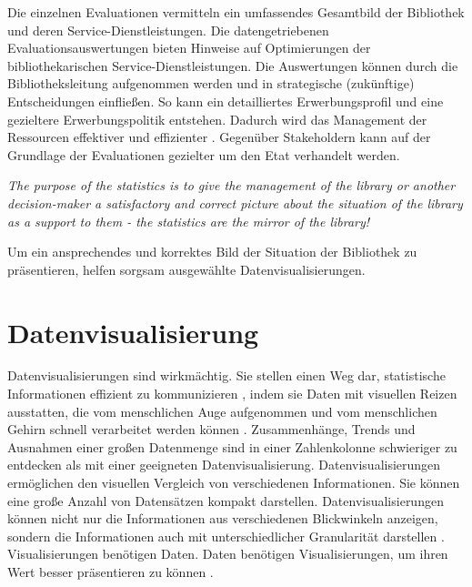 Die einzelnen Evaluationen vermitteln ein umfassendes Gesamtbild der Bibliothek und deren Service-Dienstleistungen. 
Die datengetriebenen Evaluationsauswertungen bieten Hinweise auf Optimierungen der bibliothekarischen Service-Dienstleistungen. 
Die Auswertungen können durch die Bibliotheksleitung aufgenommen werden und in strategische (zukünftige) Entscheidungen einfließen. 
So kann ein detailliertes Erwerbungsprofil und eine gezieltere Erwerbungspolitik entstehen. 
Dadurch wird das Management der Ressourcen effektiver und effizienter \cite[vgl.][297]{johnson_peggy_fundamentals_2014}.
Gegenüber Stakeholdern kann auf der Grundlage der Evaluationen gezielter um den Etat verhandelt werden.
\begin{displayquote}
    \textit{The purpose of the statistics is to give the management of the library or another decision-maker 
    a satisfactory and correct picture about the situation of the library as a support to them - the statistics are the mirror of the library!}
    \cite[463]{laitinen_markku_library_2013}
\end{displayquote}

Um ein ansprechendes und korrektes Bild der Situation der Bibliothek zu präsentieren, helfen sorgsam ausgewählte Datenvisualisierungen.



\clearpage

\section{Datenvisualisierung}
\label{chap:two_two}
Datenvisualisierungen sind wirkmächtig. Sie stellen einen Weg dar, statistische Informationen effizient zu kommunizieren \cite[vgl.][15]{Tufte01}, 
indem sie Daten mit visuellen Reizen ausstatten, die vom menschlichen Auge aufgenommen und vom menschlichen Gehirn schnell verarbeitet werden können \cite[vgl.][32]{few_now_2009}. 
Zusammenhänge, Trends und Ausnahmen einer großen Datenmenge sind in einer Zahlenkolonne schwieriger zu entdecken als mit einer geeigneten Datenvisualisierung.
Datenvisualisierungen ermöglichen den visuellen Vergleich von verschiedenen Informationen. Sie können eine große Anzahl von Datensätzen kompakt darstellen. 
Datenvisualisierungen können nicht nur die Informationen aus verschiedenen Blickwinkeln anzeigen, sondern die Informationen auch
mit unterschiedlicher Granularität darstellen \cite[vgl.][245]{muller_business_2013}.
Visualisierungen benötigen Daten. Daten benötigen Visualisierungen, um ihren Wert besser präsentieren zu können \cite[vgl.][16]{kirk_data_2019}.



